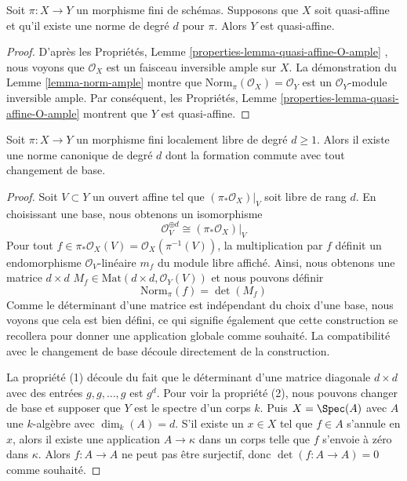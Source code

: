 \begin{lemma}
\label{lemma-norm-quasi-affine}
Soit  $\pi : X \to Y$  un morphisme fini de schémas. Supposons que  $X$  soit
quasi-affine et qu'il existe une norme de degré  $d$  pour  $\pi$.
Alors  $Y$  est quasi-affine.
\end{lemma}

\begin{proof}
D'après les Propriétés, Lemme  \ref{properties-lemma-quasi-affine-O-ample} , nous voyons que  $\mathcal{O}_X$  est un
faisceau inversible ample sur  $X$. La démonstration du Lemme  \ref{lemma-norm-ample} 
montre que  $\text{Norm}_\pi(\mathcal{O}_X) = \mathcal{O}_Y$  est un  $\mathcal{O}_Y$-module inversible ample. Par
conséquent, les Propriétés, Lemme  \ref{properties-lemma-quasi-affine-O-ample}  montrent que  $Y$  est
quasi-affine.
\end{proof}

\begin{lemma}
\label{lemma-finite-locally-free-has-norm}
Soit  $\pi : X \to Y$  un morphisme fini localement libre de degré  $d \geq 1$. Alors
il existe une norme canonique de degré  $d$  dont la formation commute avec
tout changement de base.
\end{lemma}

\begin{proof}
Soit  $V \subset Y$  un ouvert affine tel que  $(\pi_*\mathcal{O}_X)|_V$  soit libre de rang
 $d$. En choisissant une base, nous obtenons un isomorphisme
$$
\mathcal{O}_V^{\oplus d} \cong (\pi_*\mathcal{O}_X)|_V
$$
Pour tout  $f \in \pi_*\mathcal{O}_X(V) = \mathcal{O}_X(\pi^{-1}(V))$, la multiplication par  $f$  définit un endomorphisme
 $\mathcal{O}_V$-linéaire  $m_f$  du module libre affiché. Ainsi, nous
obtenons une matrice  $d \times d$   $M_f \in \text{Mat}(d \times d, \mathcal{O}_Y(V))$  et nous pouvons définir
$$
\text{Norm}_\pi(f) = \det(M_f)
$$
Comme le déterminant d'une matrice est indépendant du choix d'une base,
nous voyons que cela est bien défini, ce qui signifie également que cette
construction se recollera pour donner une application globale comme souhaité. La
compatibilité avec le changement de base découle directement de la construction.

\medskip\noindent
La propriété (1) découle du fait que le déterminant d'une matrice diagonale
 $d \times d$  avec des entrées  $g, g, \ldots, g$  est  $g^d$. Pour voir la
propriété (2), nous pouvons changer de base et supposer que  $Y$  est le
spectre d'un corps  $k$. Puis  $X = \Spec(A)$  avec  $A$  une
 $k$-algèbre avec  $\dim_k(A) = d$. S'il existe un  $x \in X$  tel que
 $f \in A$  s'annule en  $x$, alors il existe une application
 $A \to \kappa$  dans un corps telle que  $f$  s'envoie à zéro dans
 $\kappa$. Alors  $f : A \to A$  ne peut pas être surjectif, donc  $\det(f : A \to A) = 0$ 
comme souhaité.
\end{proof}

